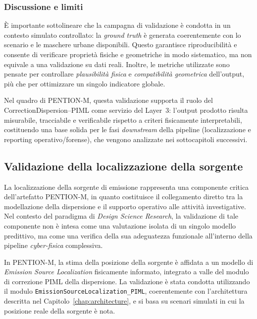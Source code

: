 \subsubsection{Discussione e limiti}
\label{sec:val_piml_discussion}

È importante sottolineare che la campagna di validazione è condotta in un contesto simulato controllato: la \textit{ground truth} è generata coerentemente con lo scenario e le maschere urbane disponibili.
Questo garantisce riproducibilità e consente di verificare proprietà fisiche e geometriche in modo sistematico, ma non equivale a una validazione su dati reali.
Inoltre, le metriche utilizzate sono pensate per controllare \emph{plausibilità fisica} e \emph{compatibilità geometrica} dell’output, più che per ottimizzare un singolo indicatore globale.

Nel quadro di \textsc{PENTION-M}, questa validazione supporta il ruolo del CorrectionDispersion--PIML come servizio del Layer~3: l’output prodotto risulta misurabile, tracciabile e verificabile rispetto a criteri fisicamente interpretabili, costituendo una base solida per le fasi \textit{downstream} della pipeline (localizzazione e reporting operativo/forense), che vengono analizzate nei sottocapitoli successivi.

\subsection{Validazione della localizzazione della sorgente}
\label{subsec:source_localization_validation}

La localizzazione della sorgente di emissione rappresenta una componente critica dell’artefatto \textsc{PENTION-M}, in quanto costituisce il collegamento diretto tra la modellazione della dispersione e il supporto operativo alle attività investigative.
Nel contesto del paradigma di \emph{Design Science Research}, la validazione di tale componente non è intesa come una valutazione isolata di un singolo modello predittivo, ma come una verifica della sua adeguatezza funzionale all’interno della pipeline \textit{cyber-fisica} complessiva.

In \textsc{PENTION-M}, la stima della posizione della sorgente è affidata a un modello di \emph{Emission Source Localization} fisicamente informato, integrato a valle del modulo di correzione PIML della dispersione.
La validazione è stata condotta utilizzando il modulo \texttt{EmissionSourceLocalization\_PIML}, coerentemente con l’architettura descritta nel Capitolo~\ref{chap:architecture}, e si basa su scenari simulati in cui la posizione reale della sorgente è nota.

